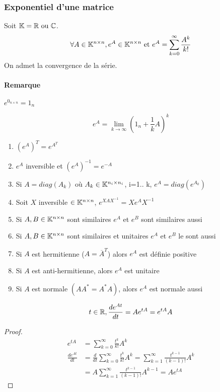 \documentclass[main.tex]{subfiles}
\begin{document}
\subsubsection{Exponentiel d'une matrice}

\begin{defin}
Soit $\mathbb{K} = \mathbb{R} \text{ ou } \mathbb{C}$.
\[ \forall A \in \mathbb{K}^{n\times n}, e^A \in \mathbb{K}^{n\times n} \text{ et } e^A = \sum_{k=0}^{\infty} \frac{A^k}{k!} \]
On admet la convergence de la série.
\end{defin}

\paragraph{Remarque} $e^{0_{n\times n}} = 1_{n}$

\begin{prop}
\[ e^A = \lim_{k \rightarrow \infty} (1_{n}+\frac{1}{k}A)^k \]
\begin{enumerate}
\item $(e^A)^T = e^{A^T}$
\item $e^A$ inversible et $(e^A)^{-1} = e^{-A}$
\item Si $A=diag(A_k)$ où $A_k\in \mathbb{K}^{n_i \times n_i}$, i=1.. k, $e^A = diag (e^{A_k})$
\item Soit $X$ inversible $\in \mathbb{K}^{n \times n}$, $e^{XAX^{-1}} = Xe^AX^{-1}$
\item Si $A,B \in \mathbb{K}^{n \times n}$ sont similaires $e^A$ et $e^B$ sont similaires aussi
\item Si $A,B \in \mathbb{K}^{n \times n}$ sont similaires et unitaires $e^A$ et $e^B$ le sont aussi
\item Si $A$ est hermitienne ($A=\overline{A}^T$) alors $e^A$ est définie positive
\item Si $A$ est anti-hermitienne, alors $e^A$ est unitaire
\item Si $A$ est normale $(AA^* = A^*A)$, alors $e^A$ est normale aussi
\end{enumerate}
\end{prop}

\begin{prop}
\[ t\in \mathbb{R}, \frac{de^{At}}{dt} = Ae^{tA} = e^{tA}A \]
\end{prop}

\begin{proof}
\begin{align*}
e^{tA} & = \sum_{k=0}^{\infty} \frac{t^k}{k!}A^k \\
\frac{de^{At}}{dt} & = \frac{d}{dt}\sum_{k=0}^{\infty} \frac{t^k}{k!}A^k  = \sum_{k=1}^{\infty} \frac{t^{k-1}}{(k-1)!}A^k \\
& = A \sum_{k=1}^{\infty} \frac{t^{k-1}}{(k-1)!}A^{k-1}  = Ae^{tA}
\end{align*}
\end{proof}
\end{document}
